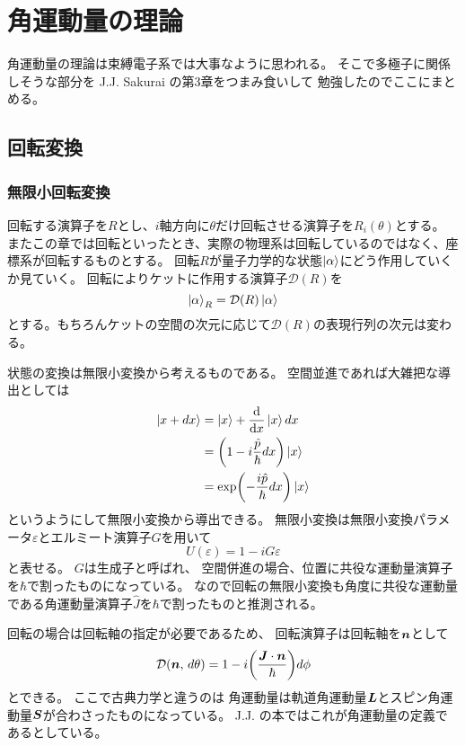 \documentclass[../../master.tex]{subfiles}
\begin{document}
\chapter{角運動量の理論}
角運動量の理論は束縛電子系では大事なように思われる。
そこで多極子に関係しそうな部分を J.J. Sakurai \cite{JJSakurai} の第3章をつまみ食いして
勉強したのでここにまとめる。

\section{回転変換}
\subsection{無限小回転変換}

回転する演算子を\(R\)とし、\(i\)軸方向に\(\theta\)だけ回転させる演算子を\(R_i(\theta)\)とする。
またこの章では回転といったとき、実際の物理系は回転しているのではなく、座標系が回転するものとする。
回転\(R\)が量子力学的な状態\(\ket{\alpha}\)にどう作用していくか見ていく。
回転によりケットに作用する演算子\(\mathcal{D}(R)\)を
\begin{equation}
    \ket{\alpha}_R = \mathcal{D}(R) \ket{\alpha}
\end{equation}
とする。もちろんケットの空間の次元に応じて\(\mathcal{D}(R)\)の表現行列の次元は変わる。

状態の変換は無限小変換から考えるものである。
空間並進であれば大雑把な導出としては
\begin{align}
    \ket{x+ dx}
    &= \ket{x} + \dv{x}\ket{x} dx \\
    &= \qty(1-i\frac{\hat{p}}{\hbar}dx)\ket{x}\\
    &= \exp(-\frac{i\hat{p}}{\hbar}dx)\ket{x}
\end{align}
というようにして無限小変換から導出できる。
無限小変換は無限小変換パラメータ\(\varepsilon\)とエルミート演算子\(G\)を用いて
\begin{equation}
    U(\varepsilon) = 1-iG\varepsilon
\end{equation}
と表せる。
\(G\)は生成子と呼ばれ、
空間併進の場合、位置に共役な運動量演算子を\(\hbar\)で割ったものになっている。
なので回転の無限小変換も角度に共役な運動量である角運動量演算子\(\hat{J}\)を\(\hbar\)で割ったものと推測される。

回転の場合は回転軸の指定が必要であるため、
回転演算子は回転軸を\(\vb*{n}\)として
\begin{equation}
    \mathcal{D}(\vb*{n},\,d\theta) = 1-i\qty(\frac{\vb*{J}\cdot\vb*{n}}{\hbar})d\phi
\end{equation}
とできる。
ここで古典力学と違うのは
角運動量は軌道角運動量\(\vb*{L}\)とスピン角運動量\(\vb*{S}\)が合わさったものになっている。
J.J. の本ではこれが角運動量の定義であるとしている。
\end{document}
